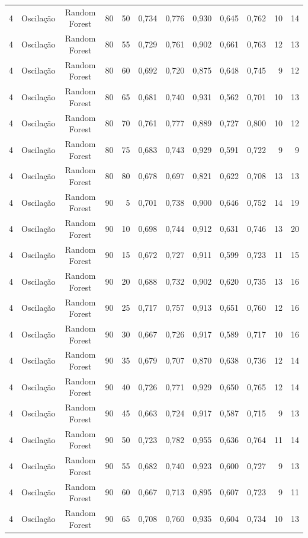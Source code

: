 \begin{longtable}{ccclrrrrrrrr}
4 & Oscilação & Random Forest & 80 & 50 & 0,734 & 0,776 & 0,930 & 0,645 & 0,762 & 10 & 14 \\
4 & Oscilação & Random Forest & 80 & 55 & 0,729 & 0,761 & 0,902 & 0,661 & 0,763 & 12 & 13 \\
4 & Oscilação & Random Forest & 80 & 60 & 0,692 & 0,720 & 0,875 & 0,648 & 0,745 & 9 & 12 \\
4 & Oscilação & Random Forest & 80 & 65 & 0,681 & 0,740 & 0,931 & 0,562 & 0,701 & 10 & 13 \\
4 & Oscilação & Random Forest & 80 & 70 & 0,761 & 0,777 & 0,889 & 0,727 & 0,800 & 10 & 12 \\
4 & Oscilação & Random Forest & 80 & 75 & 0,683 & 0,743 & 0,929 & 0,591 & 0,722 & 9 & 9 \\
4 & Oscilação & Random Forest & 80 & 80 & 0,678 & 0,697 & 0,821 & 0,622 & 0,708 & 13 & 13 \\
4 & Oscilação & Random Forest & 90 & 5 & 0,701 & 0,738 & 0,900 & 0,646 & 0,752 & 14 & 19 \\
4 & Oscilação & Random Forest & 90 & 10 & 0,698 & 0,744 & 0,912 & 0,631 & 0,746 & 13 & 20 \\
4 & Oscilação & Random Forest & 90 & 15 & 0,672 & 0,727 & 0,911 & 0,599 & 0,723 & 11 & 15 \\
4 & Oscilação & Random Forest & 90 & 20 & 0,688 & 0,732 & 0,902 & 0,620 & 0,735 & 13 & 16 \\
4 & Oscilação & Random Forest & 90 & 25 & 0,717 & 0,757 & 0,913 & 0,651 & 0,760 & 12 & 16 \\
4 & Oscilação & Random Forest & 90 & 30 & 0,667 & 0,726 & 0,917 & 0,589 & 0,717 & 10 & 16 \\
4 & Oscilação & Random Forest & 90 & 35 & 0,679 & 0,707 & 0,870 & 0,638 & 0,736 & 12 & 14 \\
4 & Oscilação & Random Forest & 90 & 40 & 0,726 & 0,771 & 0,929 & 0,650 & 0,765 & 12 & 14 \\
4 & Oscilação & Random Forest & 90 & 45 & 0,663 & 0,724 & 0,917 & 0,587 & 0,715 & 9 & 13 \\
4 & Oscilação & Random Forest & 90 & 50 & 0,723 & 0,782 & 0,955 & 0,636 & 0,764 & 11 & 14 \\
4 & Oscilação & Random Forest & 90 & 55 & 0,682 & 0,740 & 0,923 & 0,600 & 0,727 & 9 & 13 \\
4 & Oscilação & Random Forest & 90 & 60 & 0,667 & 0,713 & 0,895 & 0,607 & 0,723 & 9 & 11 \\
4 & Oscilação & Random Forest & 90 & 65 & 0,708 & 0,760 & 0,935 & 0,604 & 0,734 & 10 & 13 \\

\end{longtable}
